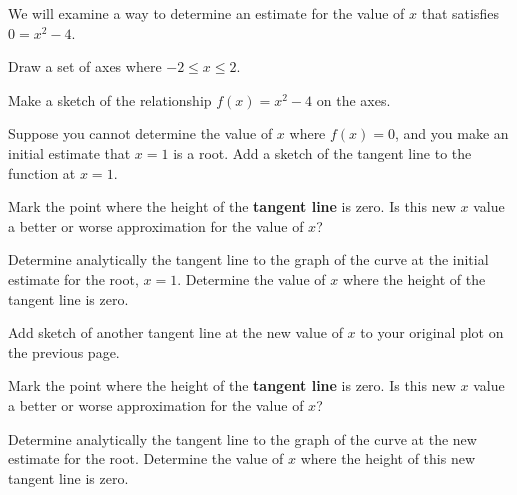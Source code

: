 \begin{problem}
\item We will examine a way to determine an estimate for the value of
  $x$ that satisfies $0=x^2-4$.
  \begin{subproblem}
  \item Draw a set of axes where $-2\leq x \leq 2$. 


    \vfill

  \item Make a sketch of the relationship $f(x)=x^2-4$ on the axes.
  \item Suppose you cannot determine the value of $x$ where $f(x)=0$,
    and you make an initial estimate that $x=1$ is a root. Add a
    sketch of the tangent line to the function at $x=1$.

  \item Mark the point where the height of the \textbf{tangent line}
    is zero. Is this new $x$ value a better or worse approximation for the value of
    $x$?  

    \vspace{2em}

    \clearpage


  \item Determine analytically the tangent line to the graph of the
    curve at the initial estimate for the root, $x=1$. Determine the
    value of $x$ where the height of the tangent line is zero.

    \vfill


  \item Add sketch of another tangent line at the new value of $x$ to
    your original plot on the previous page. 

  \item Mark the point where the height of the \textbf{tangent line}
    is zero. Is this new $x$ value a better or worse approximation for the value of
    $x$?  

    \vspace{2em}

  \item Determine analytically the tangent line to the graph of the
    curve at the new estimate for the root. Determine the value of $x$
    where the height of this new tangent line is zero.

    \vfill



\end{subproblem}
\end{problem}

